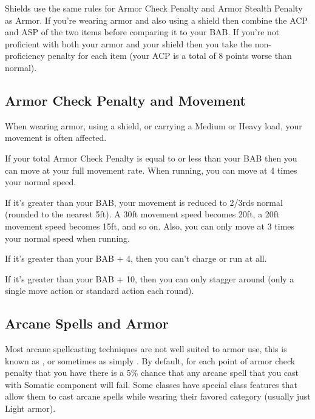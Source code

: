 Shields use the same rules for Armor Check Penalty and Armor Stealth Penalty as Armor. If you're wearing armor and also using a shield then combine the ACP and ASP of the two items before comparing it to your BAB. If you're not proficient with both your armor and your shield then you take the non-proficiency penalty for each item (your ACP is a total of 8 points worse than normal).

\subsection{Armor Check Penalty and Movement}

When wearing armor, using a shield, or carrying a Medium or Heavy load, your movement is often affected.

\begin{itemize*}
\item If your total Armor Check Penalty is equal to or less than your BAB then you can move at your full movement rate. When running, you can move at 4 times your normal speed.
\item If it's greater than your BAB, your movement is reduced to 2/3rds normal (rounded to the nearest 5ft). A 30ft movement speed becomes 20ft, a 20ft movement speed becomes 15ft, and so on. Also, you can only move at 3 times your normal speed when running.
\item If it's greater than your BAB + 4, then you can't charge or run at all.
\item If it's greater than your BAB + 10, then you can only stagger around (only a single move action or standard action each round).
\end{itemize*}

\subsection{Arcane Spells and Armor}
Most arcane spellcasting techniques are not well suited to armor use, this is known as , or sometimes as simply . By default, for each point of armor check penalty that you have there is a 5\% chance that any arcane spell that you cast with Somatic component will fail. Some classes have special class features that allow them to cast arcane spells while wearing their favored category (usually just Light armor).


